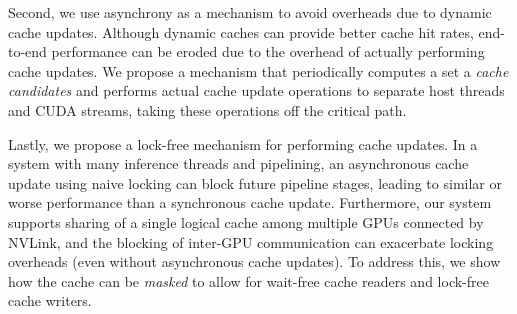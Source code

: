 
Second, we use asynchrony as a mechanism to avoid overheads due to dynamic cache updates. Although dynamic caches can provide better cache hit rates, end-to-end performance can be eroded due to the overhead of actually performing cache updates. We propose a mechanism that periodically computes a set a \textit{cache candidates} and performs actual cache update operations to separate host threads and CUDA streams, taking these operations off the critical path.

Lastly, we propose a lock-free mechanism for performing cache updates. In a system with many inference threads and pipelining, an asynchronous cache update using naive locking can block future pipeline stages, leading to similar or worse performance than a synchronous cache update. Furthermore, our system supports sharing of a single logical cache among multiple GPUs connected by NVLink, and the blocking of inter-GPU communication can exacerbate locking overheads (even without asynchronous cache updates). To address this, we show how the cache can be \textit{masked} to allow for wait-free cache readers and lock-free cache writers.


